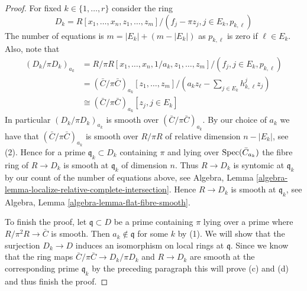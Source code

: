 \begin{proof}
\medskip\noindent
For fixed $k \in \{1, \ldots, r\}$ consider the ring
$$
D_k = R[x_1, \ldots, x_n, z_1, \ldots, z_m]/
(f_j - \pi z_j, j \in E_k, p_{k, \ell})
$$
The number of equations is $m = |E_k| + (m - |E_k|)$ as $p_{k, \ell}$
is zero if $\ell \in E_k$. Also, note that
\begin{align*}
(D_k/\pi D_k)_{a_k}
& =
R/\pi R[x_1, \ldots, x_n, 1/a_k, z_1, \ldots, z_m]/
(f_j, j \in E_k, p_{k, \ell}) \\
& =
(\bar C/\pi \bar C)_{a_k}[z_1, \ldots, z_m]/
(a_kz_\ell - \sum\nolimits_{j \in E_k} h_{k, \ell}^j z_j) \\
& \cong
(\bar C/\pi \bar C)_{a_k}[z_j, j \in E_k]
\end{align*}
In particular $(D_k/\pi D_k)_{a_k}$ is smooth over $(\bar C/\pi \bar C)_{a_k}$.
By our choice of $a_k$ we have that $(\bar C/\pi \bar C)_{a_k}$ is smooth
over $R/\pi R$ of relative dimension $n - |E_k|$, see (2). Hence for a prime
$\mathfrak q_k \subset D_k$ containing $\pi$ and lying over
$\mathop{\mathrm{Spec}}(\bar C_{a_k})$ the fibre ring of $R \to D_k$
is smooth at $\mathfrak q_k$ of dimension $n$. Thus $R \to D_k$ is syntomic
at $\mathfrak q_k$ by our count of the number of equations above, see
Algebra, Lemma \ref{algebra-lemma-localize-relative-complete-intersection}.
Hence $R \to D_k$ is smooth at $\mathfrak q_k$, see
Algebra, Lemma \ref{algebra-lemma-flat-fibre-smooth}.

\medskip\noindent
To finish the proof, let $\mathfrak q \subset D$ be a prime
containing $\pi$ lying over a prime where $R/\pi^2 R \to \bar C$
is smooth. Then $a_k \not \in \mathfrak q$ for some $k$ by (1).
We will show that the surjection $D_k \to D$ induces
an isomorphism on local rings at $\mathfrak q$. Since we know that
the ring maps $\bar C/\pi \bar C \to D_k/\pi D_k$ and
$R \to D_k$ are smooth at the corresponding prime $\mathfrak q_k$
by the preceding paragraph this will prove (c) and (d) and thus
finish the proof.


\end{proof}
